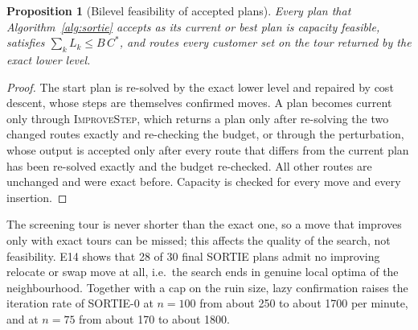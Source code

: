 \documentclass[11pt]{article}
\newtheorem{proposition}[theorem]{Proposition}
\theoremstyle{definition}
\begin{document}
\begin{proposition}[Bilevel feasibility of accepted plans]\label{prop:confirm}
Every plan that Algorithm~\ref{alg:sortie} accepts as its current or best plan
is capacity feasible, satisfies $\sum_kL_k\le B\,C^\ast$, and routes every
customer set on the tour returned by the exact lower level.
\end{proposition}
\begin{proof}
The start plan is re-solved by the exact lower level and repaired by cost
descent, whose steps are themselves confirmed moves. A plan becomes current
only through \textsc{ImproveStep}, which returns a plan only after re-solving
the two changed routes exactly and re-checking the budget, or through the
perturbation, whose output is accepted only after every route that differs
from the current plan has been re-solved exactly and the budget re-checked.
All other routes are unchanged and were exact before. Capacity is checked
for every move and every insertion.
\end{proof}

The screening tour is never shorter than the exact one, so a move that
improves only with exact tours can be missed; this affects the quality of the
search, not feasibility. E14 shows that 28 of 30 final SORTIE plans admit no
improving relocate or swap move at all, i.e.\ the search ends in genuine
local optima of the neighbourhood. Together with a cap on the ruin size, lazy
confirmation raises the iteration rate of SORTIE-0 at $n=100$ from about 250
to about 1700 per minute, and at $n=75$ from about 170 to about 1800.
\end{document}
